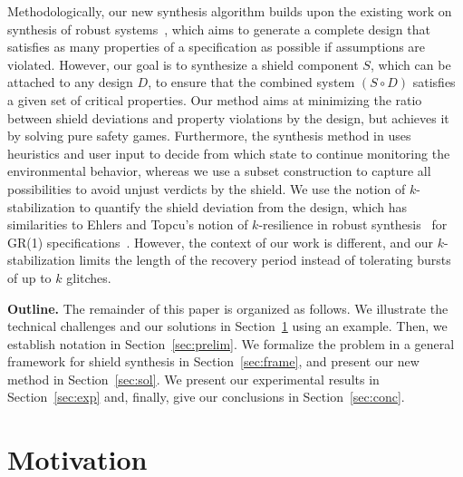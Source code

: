 \documentclass{llncs}
\newcommand{\comp}{\circ}
\begin{document}
Methodologically, our new synthesis algorithm builds upon the existing 
work on synthesis of robust systems~\cite{BloemCGHHJKK14}, which aims to 
generate a complete design that satisfies as many properties of a 
specification as possible if assumptions are violated.  However, our 
goal is to synthesize a shield component $S$, which can be attached to 
any design $D$, to ensure that the combined system $(S\comp D)$ 
satisfies a given set of critical properties.  Our method aims at 
minimizing the ratio between shield deviations and property violations 
by the design, but achieves it by solving pure safety games.  
Furthermore, the synthesis method in \cite{BloemCGHHJKK14} uses 
heuristics and user input to decide from which state to continue 
monitoring the environmental behavior, whereas we use a subset 
construction to capture all possibilities to avoid unjust verdicts by 
the shield.  We use the notion of $k$-stabilization to quantify the 
shield deviation from the design, which has similarities to Ehlers and 
Topcu's notion of $k$-resilience in robust synthesis~\cite{EhlersT14} 
for GR(1) specifications~\cite{BloemJPPS12}.  However, the context of 
our work is different, and our $k$-stabilization limits the length of 
the recovery period instead of tolerating bursts of up to $k$ glitches.


\noindent \textbf{Outline.}  
The remainder of this paper is organized as follows.  We illustrate the 
technical challenges and our solutions in Section~\ref{sec:ex} using an 
example.  Then, we establish notation in Section~\ref{sec:prelim}.  We 
formalize the problem in a general framework for shield synthesis in 
Section~\ref{sec:frame}, and present our new method in 
Section~\ref{sec:sol}.  We present our experimental results in 
Section~\ref{sec:exp} and, finally, give our conclusions in 
Section~\ref{sec:conc}.

\section{Motivation}
\label{sec:ex}
\end{document}
